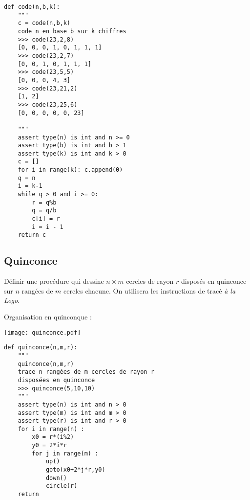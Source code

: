 {\color{red}
\begin{lstlisting}
def code(n,b,k):
    """
    c = code(n,b,k)
    code n en base b sur k chiffres
    >>> code(23,2,8)
    [0, 0, 0, 1, 0, 1, 1, 1]
    >>> code(23,2,7)
    [0, 0, 1, 0, 1, 1, 1]
    >>> code(23,5,5)
    [0, 0, 0, 4, 3]
    >>> code(23,21,2)
    [1, 2]
    >>> code(23,25,6)
    [0, 0, 0, 0, 0, 23]

    """
    assert type(n) is int and n >= 0
    assert type(b) is int and b > 1
    assert type(k) is int and k > 0
    c = []
    for i in range(k): c.append(0)
    q = n
    i = k-1
    while q > 0 and i >= 0:
        r = q%b
        q = q/b
        c[i] = r
        i = i - 1
    return c
\end{lstlisting}
}

\subsection*{Quinconce}
Définir une procédure qui dessine $n\times m$ cercles de rayon $r$
disposés en quinconce sur $n$ rangées de $m$ cercles chacune.
On utilisera les instructions de tracé {\em à la Logo}.

Organisation en quinconque : \begin{minipage}{3.5cm}\texttt{[image: quinconce.pdf]}\end{minipage}

{\color{red}
\begin{lstlisting}
def quinconce(n,m,r):
    """
    quinconce(n,m,r)
    trace n rangées de m cercles de rayon r
    disposées en quinconce
    >>> quinconce(5,10,10)
    """
    assert type(n) is int and n > 0
    assert type(m) is int and m > 0
    assert type(r) is int and r > 0
    for i in range(n) :
        x0 = r*(i%2)
        y0 = 2*i*r
        for j in range(m) :
            up()
            goto(x0+2*j*r,y0)
            down()
            circle(r)           
    return
\end{lstlisting}
}


